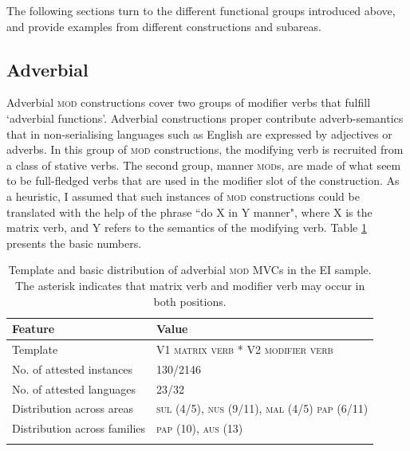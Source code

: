 The following sections turn to the different functional groups introduced above, and provide examples from different constructions and subareas.

\subsection{Adverbial}\label{sec:adverbial}

Adverbial \textsc{mod} constructions cover two groups of modifier verbs that fulfill `adverbial functions'. Adverbial constructions proper contribute adverb-semantics that in non-serialising languages such as English are expressed by adjectives or adverbs. In this group of \textsc{mod} constructions, the modifying verb is recruited from a class of stative verbs. The second group, manner \textsc{mod}s, are made of what seem to be full-fledged verbs that are used in the modifier slot of the construction. As a heuristic, I assumed that such instances of \textsc{mod} constructions could be translated with the help of the phrase ``do X in Y manner", where X is the matrix verb, and Y refers to the semantics of the modifying verb. Table \ref{table:adverbial} presents the basic numbers. 

\begin{table}
\begin{tabular}{ll}
\lsptoprule
Feature&Value\tabularnewline
\midrule
Template&V1 \textsc{matrix verb} * V2 \textsc{modifier verb}\tabularnewline
No. of attested instances& 130/2146 \tabularnewline
No. of attested languages& 23/32 \tabularnewline
Distribution across areas& \textsc{sul} (4/5), \textsc{nus} (9/11), \textsc{mal} (4/5) \textsc{pap} (6/11) \tabularnewline
Distribution across families& \textsc{pap} (10), \textsc{aus} (13) \tabularnewline
\lspbottomrule
\end{tabular}
\caption[Template and basic distribution of adverbial \textsc{mod} MVCs]{Template and basic distribution of adverbial \textsc{mod} MVCs in the EI sample. The asterisk indicates that matrix verb and modifier verb may occur in both positions.}
\label{table:adverbial}
\end{table}

